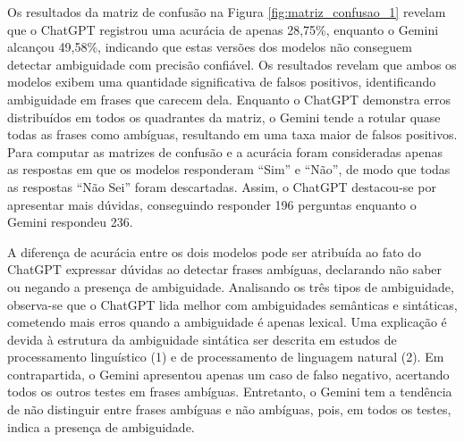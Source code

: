 Os resultados da matriz de confusão na Figura \ref{fig:matriz_confusao_1} revelam que o ChatGPT registrou uma acurácia de apenas 28,75\%, enquanto o Gemini alcançou 49,58\%, indicando que estas versões dos modelos não conseguem detectar ambiguidade com precisão confiável. Os resultados revelam que ambos os modelos exibem uma quantidade significativa de falsos positivos, identificando ambiguidade em frases que carecem dela. Enquanto o ChatGPT demonstra erros distribuídos em todos os quadrantes da matriz, o Gemini tende a rotular quase todas as frases como ambíguas, resultando em uma taxa maior de falsos positivos. Para computar as matrizes de confusão e a acurácia foram consideradas apenas as respostas em que os modelos responderam \enquote{Sim} e \enquote{Não}, de modo que todas as respostas \enquote{Não Sei} foram descartadas. Assim, o ChatGPT destacou-se por apresentar mais dúvidas, conseguindo responder 196 perguntas enquanto o Gemini respondeu 236.


A diferença de acurácia entre os dois modelos pode ser atribuída ao fato do ChatGPT expressar dúvidas ao detectar frases ambíguas, declarando não saber ou negando a presença de ambiguidade. Analisando os três tipos de ambiguidade, observa-se que o ChatGPT lida melhor com ambiguidades semânticas e sintáticas, cometendo mais erros quando a ambiguidade é apenas lexical. Uma explicação é devida à estrutura da ambiguidade sintática ser descrita em estudos de processamento linguístico \cite{maiadimensoes} (1) e de processamento de linguagem natural \cite{padovani2022metodo}(2). Em contrapartida, o Gemini apresentou apenas um caso de falso negativo, acertando todos os outros testes em frases ambíguas. Entretanto, o Gemini tem a tendência de não distinguir entre frases ambíguas e não ambíguas, pois, em todos os testes, indica a presença de ambiguidade.




